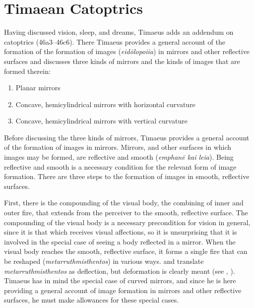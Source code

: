
\section{Timaean Catoptrics} %
\label{sec:timaen_catoptrics}

Having discussed vision, sleep, and dreams, Timaeus adds an addendum on catoptrics (46a3–46c6). There Timaeus provides a general account of the formation of the formation of images (\emph{eidōlopoiia}) in mirrors and other reflective surfaces and discusses three kinds of mirrors and the kinds of images that are formed therein:
\begin{enumerate}
	\item Planar mirrors
	\item Concave, hemicylindrical mirrors with horizontal curvature
	\item Concave, hemicylindrical mirrors with vertical curvature
\end{enumerate}

Before discussing the three kinds of mirrors, Timaeus provides a general account of the formation of images in mirrors. Mirrors, and other surfaces in which images may be formed, are reflective and smooth (\emph{emphanē kai leia}). Being reflective and smooth is a necessary condition for the relevant form of image formation. There are three steps to the formation of images in smooth, reflective surfaces. 

First, there is the compounding of the visual body, the combining of inner and outer fire, that extends from the perceiver to the smooth, reflective surface. The compounding of the visual body is a necessary precondition for vision in general, since it is that which receives visual affections, so it is unsurprising that it is involved in the special case of seeing a body reflected in a mirror. When the visual body reaches the smooth, reflective surface, it forms a single fire that can be reshaped (\emph{metarruthmisthentos}) in various ways. \citet[159]{Archer-Hind:1888qd} and \citet[103]{Bury:1929jb} translate \emph{metarruthmisthentos} as deflection, but deformation is clearly meant (see \citealt[287]{Taylor:1928qb}, \citealt[154]{Cornford:1935fk}). Timaeus has in mind the special case of curved mirrors, and since he is here providing a general account of image formation in mirrors and other reflective surfaces, he must make allowances for these special cases. 

